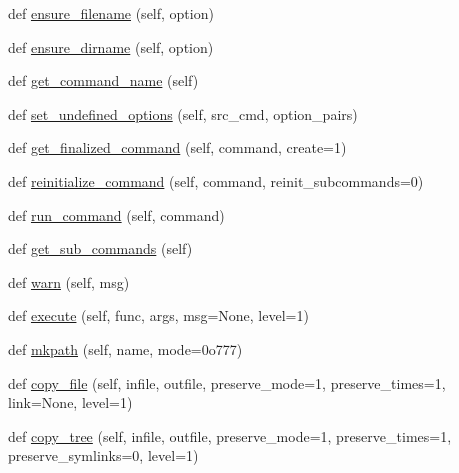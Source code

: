 \begin{DoxyCompactItemize}
\item 
def \hyperlink{classsetuptools_1_1__distutils_1_1cmd_1_1Command_a24e930163690fa683de4d8a1135b22d8}{ensure\+\_\+filename} (self, option)
\item 
def \hyperlink{classsetuptools_1_1__distutils_1_1cmd_1_1Command_aff0c8bd2c728235af03f1a298d0795df}{ensure\+\_\+dirname} (self, option)
\item 
def \hyperlink{classsetuptools_1_1__distutils_1_1cmd_1_1Command_acb4b402ef96611a7b0fbf717ffbb3807}{get\+\_\+command\+\_\+name} (self)
\item 
def \hyperlink{classsetuptools_1_1__distutils_1_1cmd_1_1Command_a43ecf80070150ef61f8b991c7e35a580}{set\+\_\+undefined\+\_\+options} (self, src\+\_\+cmd, option\+\_\+pairs)
\item 
def \hyperlink{classsetuptools_1_1__distutils_1_1cmd_1_1Command_a09d3bf8e912072dce360a2e78d28cd75}{get\+\_\+finalized\+\_\+command} (self, command, create=1)
\item 
def \hyperlink{classsetuptools_1_1__distutils_1_1cmd_1_1Command_ab5b1984575c94405c0f12af288d43f65}{reinitialize\+\_\+command} (self, command, reinit\+\_\+subcommands=0)
\item 
def \hyperlink{classsetuptools_1_1__distutils_1_1cmd_1_1Command_a98e33c257a53ec1d0bc9e649e60af970}{run\+\_\+command} (self, command)
\item 
def \hyperlink{classsetuptools_1_1__distutils_1_1cmd_1_1Command_a49e5b14e45c41ac8030b2c001cdf9736}{get\+\_\+sub\+\_\+commands} (self)
\item 
def \hyperlink{classsetuptools_1_1__distutils_1_1cmd_1_1Command_a6ebd8c0c6b84226dbf999232ac4a33a4}{warn} (self, msg)
\item 
def \hyperlink{classsetuptools_1_1__distutils_1_1cmd_1_1Command_aa15b5cefcab5f7c3de4f87976d647744}{execute} (self, func, args, msg=None, level=1)
\item 
def \hyperlink{classsetuptools_1_1__distutils_1_1cmd_1_1Command_af04c690e046e6c5c8d64fbc7f889fc4e}{mkpath} (self, name, mode=0o777)
\item 
def \hyperlink{classsetuptools_1_1__distutils_1_1cmd_1_1Command_a51294ab9ee41bd60e21b6818ab1d0697}{copy\+\_\+file} (self, infile, outfile, preserve\+\_\+mode=1, preserve\+\_\+times=1, link=None, level=1)
\item 
def \hyperlink{classsetuptools_1_1__distutils_1_1cmd_1_1Command_acfc87e9fa56d525198cbcea379cc48e0}{copy\+\_\+tree} (self, infile, outfile, preserve\+\_\+mode=1, preserve\+\_\+times=1, preserve\+\_\+symlinks=0, level=1)

\end{DoxyCompactItemize}
